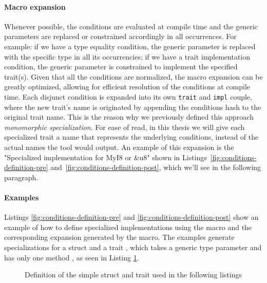 \paragraph{Macro expansion}
Whenever possible, the conditions are evaluated at compile time and the generic parameters are replaced or constrained accordingly in all occurrences.
For example: if we have a type equality condition, the generic parameter is replaced with the specific type in all its occurrencies; if we have a trait implementation condition, the generic parameter is constrained to implement the specified trait(s).
Given that all the conditions are normalized, the macro expansion can be greatly optimized, allowing for efficient resolution of the conditions at compile time.
Each disjunct condition is expanded into its own \texttt{trait} and \texttt{impl} couple, where the new trait's name is originated by appending the conditions hash to the original trait name.
This is the reason why we previously defined this approach \textit{monomorphic specialization}.
For ease of read, in this thesis we will give each specialized trait a name that represents the underlying conditions, instead of the actual names the tool would output.
An example of this expansion is the "Specialized implementation for MyI8 or \&u8" shown in Listings~\ref{fig:conditions-definition-pre} and~\ref{fig:conditions-definition-post}, which we'll see in the following paragraph.

\paragraph{Examples}
Listings \ref{fig:conditions-definition-pre} and \ref{fig:conditions-definition-post} show an example of how to define specialized implementations using the  macro and the corresponding expansion generated by the macro.
The examples generate specializations for a struct  and a trait , which takes a generic type parameter  and has only one method , as seen in Listing \ref{fig:conditions-definition-common}.

\begin{figure}[htbp!]
	\centering
	\captionsetup{type=listing,skip=2pt}
	\caption{Definition of the simple struct and trait used in the following listings}
	\label{fig:conditions-definition-common}
\end{figure}

